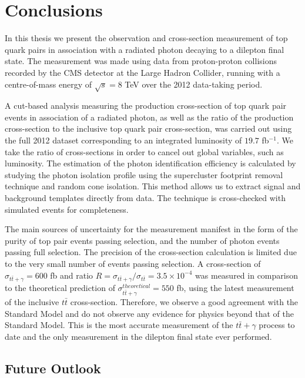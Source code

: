 \chapter*{Conclusions}\label{chap-conclusions}

In this thesis we present the observation and cross-section measurement of top quark pairs in association with a radiated photon decaying to a dilepton final state. The measurement was made using data from proton-proton collisions recorded by the CMS detector at the Large Hadron Collider, running with a centre-of-mass energy of $\sqrt{s} = 8$ TeV over the 2012 data-taking period. 

A cut-based analysis measuring the production cross-section of top quark pair events in association of a radiated photon, as well as the ratio of the production cross-section to the inclusive top quark pair cross-section, was carried out using the full 2012 dataset corresponding to an integrated luminosity of $19.7$ fb$^{-1}$. We take the ratio of cross-sections in order to cancel out global variables, such as luminosity. The estimation of the photon identification efficiency is calculated by studying the photon isolation profile using the supercluster footprint removal technique and random cone isolation. This method allows us to extract signal and background templates directly from data. The technique is cross-checked with simulated events for completeness. 

The main sources of uncertainty for the measurement manifest in the form of the purity of top pair events passing selection, and the number of photon events passing full selection. The precision of the cross-section calculation is limited due to the very small number of events passing selection. A cross-section of $\sigma_{t\bar{t}+\gamma} = 600$ fb and ratio $R = \sigma_{t\bar{t}+\gamma}/\sigma_{t\bar{t}} = 3.5 \times 10^{-4}$ was measured in comparison to the theoretical prediction of $\sigma_{t\bar{t}+\gamma}^{theoretical} = 550$ fb, using the latest measurement of the inclusive $t\bar{t}$ cross-section. Therefore, we observe a good agreement with the Standard Model and do not observe any evidence for physics beyond that of the Standard Model. This is the most accurate measurement of the $t\bar{t}+\gamma$ process to date and the only measurement in the dilepton final state ever performed.  


\section{Future Outlook}

